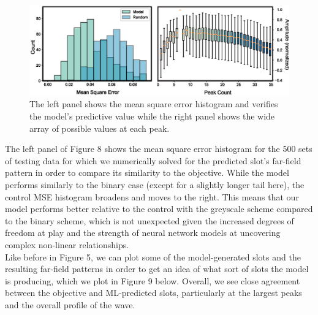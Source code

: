 \documentclass[11pt]{article}
\begin{document}
\begin{figure}[H]
	\includegraphics[width=6.5in]{figures/histboxgrey.eps}
		\caption{The left panel shows the mean square error histogram and verifies the model's predictive value while the right panel shows the wide array of possible values at each peak.}
\end{figure}

\noindent The left panel of Figure 8 shows the mean square error histogram for the 500 sets of testing data for which we numerically solved for the predicted slot's far-field pattern in order to compare its similarity to the objective. While the model performs similarly to the binary case (except for a slightly longer tail here), the control MSE histogram broadens and moves to the right. This means that our model performs better relative to the control with the greyscale scheme compared to the binary scheme, which is not unexpected given the increased degrees of freedom at play and the strength of neural network models at uncovering complex non-linear relationships.  \\


\noindent Like before in Figure 5, we can plot some of the model-generated slots and the resulting far-field patterns in order to get an idea of what sort of slots the model is producing, which we plot in Figure 9 below. Overall, we see close agreement between the objective and ML-predicted slots, particularly at the largest peaks and the overall profile of the wave.
\end{document}
